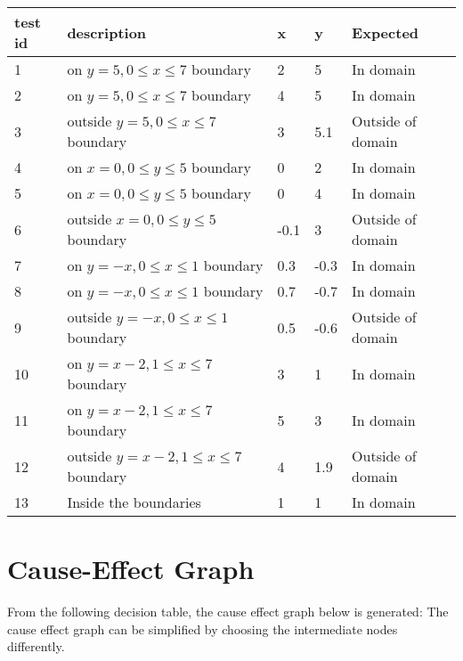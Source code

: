 \documentclass[letterpaper]{article}
\begin{document}
\begin{adjustbox}{center}
	\begin{tabular}{lllll}
		test id & description                              & x    & y    & Expected          \\ \hline
		1       & on $y=5, 0\leq x\leq 7$ boundary         & 2    & 5    & In domain         \\
		2       & on $y=5, 0\leq x\leq 7$ boundary         & 4    & 5    & In domain         \\
		3       & outside $y=5, 0\leq x\leq 7$ boundary    & 3    & 5.1  & Outside of domain \\
		4       & on $x=0, 0\leq y \leq 5$ boundary        & 0    & 2    & In domain         \\
		5       & on $x=0, 0\leq y \leq 5$ boundary        & 0    & 4    & In domain         \\
		6       & outside $x=0, 0\leq y \leq 5$ boundary   & -0.1 & 3    & Outside of domain \\
		7       & on $y=-x, 0\leq x\leq 1$ boundary        & 0.3  & -0.3 & In domain         \\
		8       & on $y=-x, 0\leq x\leq 1$ boundary        & 0.7  & -0.7 & In domain         \\
		9       & outside  $y=-x, 0\leq x\leq 1$ boundary  & 0.5  & -0.6 & Outside of domain \\
		10      & on $y=x-2, 1\leq x \leq 7$ boundary      & 3    & 1    & In domain         \\
		11      & on $y=x-2, 1\leq x \leq 7$ boundary      & 5    & 3    & In domain         \\
		12      & outside $y=x-2, 1\leq x \leq 7$ boundary & 4    & 1.9  & Outside of domain \\
		13      & Inside the boundaries                    & 1    & 1    & In domain         \\
	\end{tabular}
\end{adjustbox}

\section{Cause-Effect Graph}
From the following decision table, the cause effect graph below is generated:
The cause effect graph can be simplified by choosing the intermediate nodes
differently. \vspace{20pt}
\end{document}
